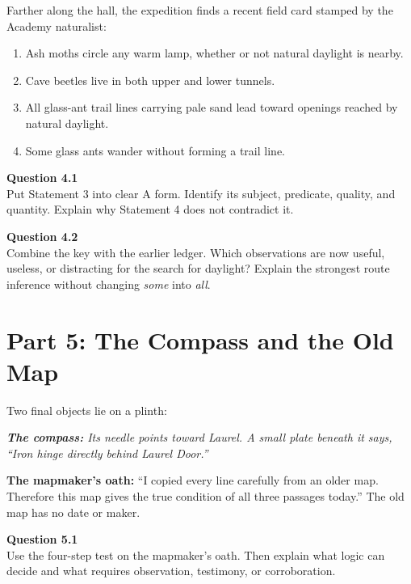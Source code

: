 \documentclass[12pt]{article}
\newcommand{\cluebox}[1]{%
\par\vspace{0.12em}\noindent\begin{minipage}{\textwidth}\itshape #1\end{minipage}\par\vspace{0.12em}}
\begin{document}
Farther along the hall, the expedition finds a recent field card stamped by the Academy naturalist:

\cluebox{
\begin{enumerate}[label=\arabic*.,leftmargin=1.7em,itemsep=0.12em]
\item Ash moths circle any warm lamp, whether or not natural daylight is nearby.
\item Cave beetles live in both upper and lower tunnels.
\item All glass-ant trail lines carrying pale sand lead toward openings reached by natural daylight.
\item Some glass ants wander without forming a trail line.
\end{enumerate}}

\textbf{Question 4.1}\\[-0.15em]
Put Statement 3 into clear A form. Identify its subject, predicate, quality, and quantity. Explain why Statement 4 does not contradict it.


\textbf{Question 4.2}\\[-0.15em]
Combine the key with the earlier ledger. Which observations are now useful, useless, or distracting for the search for daylight? Explain the strongest route inference without changing \emph{some} into \emph{all}.


\newpage

\section*{Part 5: The Compass and the Old Map}

Two final objects lie on a plinth:

\cluebox{\textbf{The compass:} Its needle points toward Laurel. A small plate beneath it says, ``Iron hinge directly behind Laurel Door.''

\textbf{The mapmaker's oath:} ``I copied every line carefully from an older map. Therefore this map gives the true condition of all three passages today.'' The old map has no date or maker.}

\textbf{Question 5.1}\\[-0.15em]
Use the four-step test on the mapmaker's oath. Then explain what logic can decide and what requires observation, testimony, or corroboration.

\end{document}
